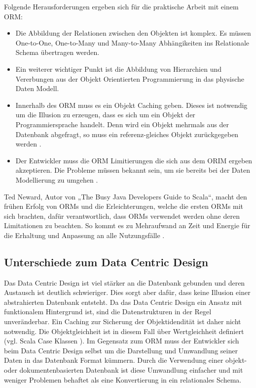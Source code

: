 Folgende Herausforderungen ergeben sich für die praktische Arbeit mit einem ORM:

\begin{itemize}
  \item Die Abbildung der Relationen zwischen den Objekten ist komplex. Es müssen One-to-One, One-to-Many und Many-to-Many Abhängikeiten ins Relationale Schema übertragen werden.
\item Ein weiterer wichtiger Punkt ist die Abbildung von Hierarchien und Vererbungen aus der Objekt Orientierten Programmierung in das physische Daten Modell. 
\item Innerhalb des ORM muss es ein Objekt Caching geben. Dieses ist notwendig um die Illusion zu erzeugen, dass es sich um ein Objekt der Programmiersprache handelt. Denn wird ein Objekt mehrmals aus der Datenbank abgefragt, so muss ein referenz-gleiches Objekt zurückgegeben werden \cite{inappropriate-abstractions}.
\item Der Entwickler muss die ORM Limitierungen die sich aus dem ORIM ergeben akzeptieren. Die Probleme müssen bekannt sein, um sie bereits bei der Daten Modellierung zu umgehen \cite{vietnam}. 
\end{itemize}

Ted Neward, Autor von „The Busy Java Developers Guide to Scala“, macht den frühen Erfolg von ORMs und die Erleichterungen, welche die ersten ORMs mit sich brachten, dafür verantwortlich, dass ORMs verwendet werden ohne deren Limitationen zu beachten. So kommt es zu Mehraufwand an Zeit und Energie für die Erhaltung und Anpassung an alle Nutzungsfälle \cite{vietnam}.

\subsection{Unterschiede zum Data Centric Design}
Das Data Centric Design ist viel stärker an die Datenbank gebunden und deren Austausch ist deutlich schwieriger. Dies sorgt aber dafür, dass keine Illusion einer abstrahierten Datenbank entsteht. Da das Data Centric Design ein Ansatz mit funktionalem Hintergrund ist, sind die Datenstrukturen in der Regel unveränderbar. Ein Caching zur Sicherung der Objektidendität ist daher nicht notwendig. Die Objektgleichheit ist in diesem Fall über Wertgleichheit definiert (vgl. Scala Case Klassen \cite{scala-case-class}). Im Gegensatz zum ORM muss der Entwickler sich beim Data Centric Design selbst um die Darstellung und Umwandlung seiner Daten in das Datenbank Format kümmern. Durch die Verwendung einer objekt- oder dokumentenbasierten Datenbank ist diese Umwandlung einfacher und mit weniger Problemen behaftet als eine Konvertierung in ein relationales Schema.

